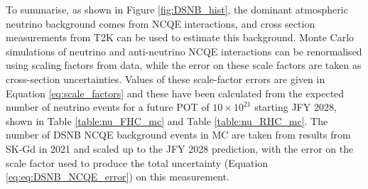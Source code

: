 To summarise, as shown in Figure \ref{fig:DSNB_hist}, the dominant atmospheric neutrino background comes from NCQE interactions, and cross section measurements from T2K can be used to estimate this background. Monte Carlo simulations of neutrino and anti-neutrino NCQE interactions can be renormalised using scaling factors from data, while the error on these scale factors are taken as cross-section uncertainties. Values of these scale-factor errors are given in Equation \ref{eq:scale_factors} and these have been calculated from the expected number of neutrino events for a future POT of $10 \times 10^{21}$ starting JFY 2028, shown in Table \ref{table:nu_FHC_mc} and Table \ref{table:nu_RHC_mc}. The number of DSNB NCQE background events in MC are taken from results from SK-Gd in 2021 and scaled up to the JFY 2028 prediction, with the error on the scale factor used to produce the total uncertainty (Equation \ref{eq:eq:DSNB_NCQE_error}) on this measurement. 

